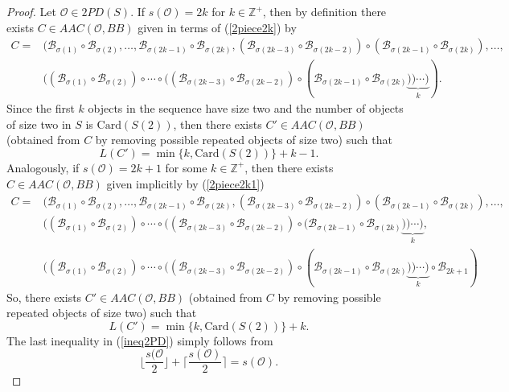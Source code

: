 \documentclass[letterpaper,12pt]{article}
\theoremstyle{definition}
\begin{document}
\begin{proof}
Let $\mathscr{O} \in 2PD(S)$. If $s(\mathscr{O})=2k$ for $k \in \mathbb{Z}^+$, then by definition there exists $C \in AAC(\mathscr{O},BB)$ given in terms of (\ref{2piece2k}) by  
\begin{equation*}
\begin{split}
   C= & (\mathscr{B}_{\sigma(1)} \circ \mathscr{B}_{\sigma(2)}, \dots,\mathscr{B}_{\sigma(2k-1)} \circ \mathscr{B}_{\sigma(2k)}, (\mathscr{B}_{\sigma(2k-3)} \circ \mathscr{B}_{\sigma(2k-2)}) \circ (\mathscr{B}_{\sigma(2k-1)} \circ \mathscr{B}_{\sigma(2k)}),\dots,\\& ((\mathscr{B}_{\sigma(1)} \circ \mathscr{B}_{\sigma(2)}) \circ \cdots \circ ((\mathscr{B}_{\sigma(2k-3)} \circ \mathscr{B}_{\sigma(2k-2)}) \circ (\mathscr{B}_{\sigma(2k-1)} \circ \mathscr{B}_{\sigma(2k)}\underbrace{)) \cdots )}_{k}). 
   \end{split}
\end{equation*}
Since the first $k$ objects in the sequence have size two and the number of objects of size two in $S$ is $\text{Card}(S(2))$, then there exists $C' \in AAC(\mathscr{O},BB)$ (obtained from $C$ by removing possible repeated objects of size two) such that  
\begin{equation*}
    L(C')= \min \{k, \text{Card}(S(2)) \} + k-1.
\end{equation*}
Analogously, if $s(\mathscr{O})=2k+1$ for some $k \in \mathbb{Z}^+$, then there exists $C \in AAC(\mathscr{O},BB)$ given implicitly by (\ref{2piece2k1})
\begin{equation*}
\begin{split}
   C= & (\mathscr{B}_{\sigma(1)} \circ \mathscr{B}_{\sigma(2)}, \dots,\mathscr{B}_{\sigma(2k-1)} \circ \mathscr{B}_{\sigma(2k)}, (\mathscr{B}_{\sigma(2k-3)} \circ \mathscr{B}_{\sigma(2k-2)}) \circ (\mathscr{B}_{\sigma(2k-1)} \circ \mathscr{B}_{\sigma(2k)}),\dots,\\& ((\mathscr{B}_{\sigma(1)} \circ \mathscr{B}_{\sigma(2)}) \circ \cdots \circ ((\mathscr{B}_{\sigma(2k-3)} \circ \mathscr{B}_{\sigma(2k-2)}) \circ (\mathscr{B}_{\sigma(2k-1)} \circ \mathscr{B}_{\sigma(2k)}\underbrace{)) \cdots )}_{k},\\
   & ((\mathscr{B}_{\sigma(1)} \circ \mathscr{B}_{\sigma(2)}) \circ \cdots \circ ((\mathscr{B}_{\sigma(2k-3)} \circ \mathscr{B}_{\sigma(2k-2)}) \circ (\mathscr{B}_{\sigma(2k-1)} \circ \mathscr{B}_{\sigma(2k)}\underbrace{)) \cdots )}_{k}\circ \mathscr{B}_{2k+1}) 
   \end{split}
\end{equation*}
So, there exists $C' \in AAC(\mathscr{O},BB)$ (obtained from $C$ by removing possible repeated objects of size two) such that 
\begin{equation*}
    L(C')= \min \{k, \text{Card}(S(2)) \} + k.
\end{equation*}
The last inequality in (\ref{ineq2PD}) simply follows from 
\begin{equation*}
   \bigg\lfloor \frac{s(\mathscr{O}}{2} \bigg\rfloor + \bigg\lceil \frac{s(\mathscr{O})}{2} \bigg\rceil = s(\mathscr{O}).
\end{equation*}
\end{proof}
\end{document}
